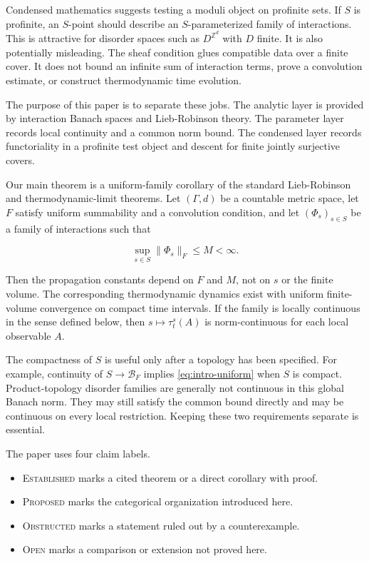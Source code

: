 \documentclass[12pt]{article}
\theoremstyle{definition}
\theoremstyle{remark}
\newcommand{\EST}{\textsc{Established}}
\newcommand{\PROP}{\textsc{Proposed}}
\newcommand{\OBS}{\textsc{Obstructed}}
\newcommand{\OPEN}{\textsc{Open}}
\begin{document}
Condensed mathematics suggests testing a moduli object on profinite sets.  If
$S$ is profinite, an $S$-point should describe an $S$-parameterized family of
interactions.  This is attractive for disorder spaces such as
$D^{\mathbb Z^d}$ with $D$ finite.  It is also potentially misleading.  The
sheaf condition glues compatible data over a finite cover.  It does not bound
an infinite sum of interaction terms, prove a convolution estimate, or
construct thermodynamic time evolution.

The purpose of this paper is to separate these jobs.  The analytic layer is
provided by interaction Banach spaces and Lieb-Robinson theory.  The
parameter layer records local continuity and a common norm bound.  The
condensed layer records functoriality in a profinite test object and descent
for finite jointly surjective covers.

Our main theorem is a uniform-family corollary of the standard
Lieb-Robinson and thermodynamic-limit theorems.  Let $(\Gamma,d)$ be a
countable metric space, let $F$ satisfy uniform summability and a convolution
condition, and let $(\Phi_s)_{s\in S}$ be a family of interactions such that

\begin{equation}
  \sup_{s\in S}\|\Phi_s\|_F\le M<\infty.
  \label{eq:intro-uniform}
\end{equation}

Then the propagation constants depend on $F$ and $M$, not on $s$ or the
finite volume.  The corresponding thermodynamic dynamics exist with uniform
finite-volume convergence on compact time intervals.  If the family is
locally continuous in the sense defined below, then
$s\mapsto\tau_t^s(A)$ is norm-continuous for each local observable $A$.

The compactness of $S$ is useful only after a topology has been specified.
For example, continuity of $S\to\mathcal B_F$ implies
\cref{eq:intro-uniform} when $S$ is compact.  Product-topology disorder
families are generally not continuous in this global Banach norm.  They may
still satisfy the common bound directly and may be continuous on every local
restriction.  Keeping these two requirements separate is essential.

The paper uses four claim labels.

\begin{itemize}[leftmargin=2.3em]
\item \EST{} marks a cited theorem or a direct corollary with proof.
\item \PROP{} marks the categorical organization introduced here.
\item \OBS{} marks a statement ruled out by a counterexample.
\item \OPEN{} marks a comparison or extension not proved here.
\end{itemize}
\end{document}
